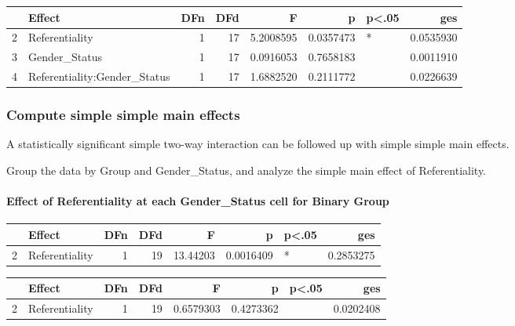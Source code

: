 \documentclass[
]{article}
\begin{document}
\begin{table}

\centering
\begin{tabular}[t]{l|l|r|r|r|r|l|r}
\hline
  & Effect & DFn & DFd & F & p & p<.05 & ges\\
\hline
2 & Referentiality & 1 & 17 & 5.2008595 & 0.0357473 & * & 0.0535930\\
\hline
3 & Gender\_Status & 1 & 17 & 0.0916053 & 0.7658183 &  & 0.0011910\\
\hline
4 & Referentiality:Gender\_Status & 1 & 17 & 1.6882520 & 0.2111772 &  & 0.0226639\\
\hline
\end{tabular}
\end{table}

\subsubsection{Compute simple simple main
effects}\label{compute-simple-simple-main-effects}

A statistically significant simple two-way interaction can be followed
up with simple simple main effects.

Group the data by Group and Gender\_Status, and analyze the simple main
effect of Referentiality.

\paragraph{Effect of Referentiality at each Gender\_Status cell for
Binary
Group}\label{effect-of-referentiality-at-each-gender_status-cell-for-binary-group}

\begin{table}

\centering
\begin{tabular}[t]{l|l|r|r|r|r|l|r}
\hline
  & Effect & DFn & DFd & F & p & p<.05 & ges\\
\hline
2 & Referentiality & 1 & 19 & 13.44203 & 0.0016409 & * & 0.2853275\\
\hline
\end{tabular}
\end{table}

\begin{table}

\centering
\begin{tabular}[t]{l|l|r|r|r|r|l|r}
\hline
  & Effect & DFn & DFd & F & p & p<.05 & ges\\
\hline
2 & Referentiality & 1 & 19 & 0.6579303 & 0.4273362 &  & 0.0202408\\
\hline
\end{tabular}
\end{table}
\end{document}
